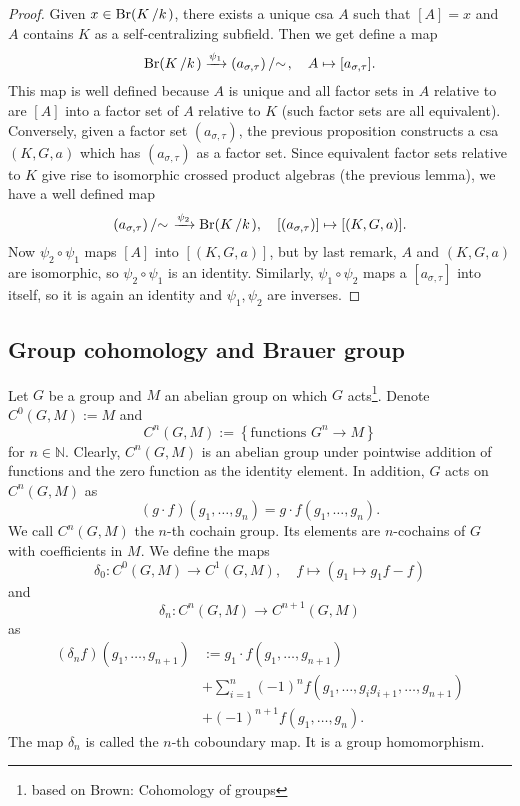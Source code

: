 \documentclass[10pt, a4paper]{article}
\newenvironment{noticeC}{%
  \tcolorbox[%
  notitle,
  empty,
  enhanced,  %
  breakable,
  coltext=black, 
  fontupper=\rmfamily,
  noparskip,
  sharp corners,
  boxrule=-1pt,  %
  frame hidden,
  left=7pt,  %
  right=7pt,
  top=5pt,
  bottom=5pt,
  before skip=2.5ex plus 2pt,
  after skip=2.5ex plus 2pt,
  overlay unbroken and last={%
  },
  ]}
{\endtcolorbox}
\newenvironment{myproof}%
  {\begin{noticeC}\begin{proof}}%
  {\end{proof}\end{noticeC}}
\newcommand{\N}{\mathbb {N}}
\newcommand{\quot}[2]{{\raisebox{0em}{$#1$}\left/\raisebox{0em}{$#2$}\right.}}
\DeclareMathOperator{\brauer}{Br}
\begin{document}
\begin{myproof}
  Given $x \in \brauer (\quot{K}{k})$, there exists a unique csa $A$ such that $[A] = x$ and $A$ contains $K$ as a self-centralizing subfield.
  Then we get define a map
  $$\brauer (\quot{K}{k}) \xrightarrow{\psi_1} \quot{(a_{\sigma, \tau})}{\sim},\quad A \mapsto [a_{\sigma, \tau}].$$
  This map is well defined because $A$ is unique and all factor sets in $A$ relative to are 
  $[A]$ into a factor set of $A$ relative to $K$ (such factor sets are all equivalent).
  Conversely, given a factor set $(a_{\sigma, \tau})$, the previous proposition constructs a csa $(K, G, a)$
  which has $(a_{\sigma, \tau})$ as a factor set. 
  Since equivalent factor sets relative to $K$ give rise to isomorphic crossed product algebras (the previous lemma),
  we have a well defined map 
  $$\quot{(a_{\sigma, \tau})}{\sim} \xrightarrow{\psi_2} \brauer (\quot{K}{k}),\quad [(a_{\sigma, \tau})] \mapsto [(K, G, a)].$$
  Now $\psi_2 \circ \psi_1$ maps $[A]$ into $[(K, G, a)]$, but by last remark, $A$ and $(K, G, a)$ are isomorphic, so $\psi_2 \circ\psi_1$ is an identity.
  Similarly, $\psi_1 \circ \psi_2$ maps a $[a_{\sigma, \tau}]$ into itself, so it is again an identity and $\psi_1, \psi_2$ are inverses.
\end{myproof}

\subsection{Group cohomology and Brauer group}

Let $G$ be a group and $M$ an abelian group on which $G$ acts\footnote{based on Brown: Cohomology of groups}.
Denote $C^0 (G, M) := M$ and 
$$C^n (G, M) := \left\{ \textrm{functions $G^n \to M$} \right\}$$
for $n \in \N$. Clearly, $C^n (G, M)$ is an abelian group under pointwise 
addition of functions and the zero function as the identity element.
In addition, $G$ acts on $C^n (G, M)$ as 
$$(g \cdot f) (g_1, \dots, g_n) = g \cdot f(g_1, \dots, g_n).$$
We call $C^n (G, M)$ the $n$-th cochain group. Its elements are $n$-cochains of $G$ with coefficients in $M$.
We define the maps $$\delta_0 : C^0 (G, M) \to C^1 (G, M),\quad f \mapsto (g_1 \mapsto g_1 f - f)$$
and $$\delta_n : C^n (G, M) \to C^{n + 1} (G, M)$$ 
as \begin{align*}
  (\delta_n f) (g_1, \dots, g_{n + 1}) &:= g_1 \cdot f(g_1, \dots, g_{n + 1}) \\
  &+ \sum_{i = 1} ^n (-1)^n f(g_1, \dots, g_i g_{i + 1}, \dots, g_{n + 1})\\
  &+ (-1)^{n + 1} f(g_1, \dots, g_n).
\end{align*}
The map $\delta_n$ is called the $n$-th coboundary map. It is a group homomorphism.
\end{document}
